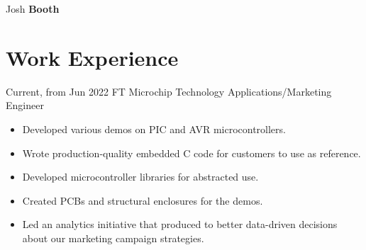 \documentclass[
	10pt, %
]{FreemanCV}
\begin{document}
\begin{paracol}{2} %


\parbox[][0.05\textheight][c]{\linewidth}{ %
	\centering %
	
	{\sffamily\Huge Josh \textbf{Booth}} %
	
	\medskip %
	
	
	\vfill %
}

\vspace*{-4pt}
\section{Work Experience}





\jobentry
	{Current, from Jun 2022} %
	{FT} %
	{Microchip Technology} %
	{Applications/Marketing Engineer} %
	{ %
	\vspace{-15pt}
	\begin{itemize}[leftmargin=0pt]
		\item Developed various demos on PIC and AVR microcontrollers.
		\item Wrote production-quality embedded C code for customers to use as reference.
		\item Developed microcontroller libraries for abstracted use.
		\item Created PCBs and structural enclosures for the demos.
		\item Led an analytics initiative that produced to better data-driven decisions about our marketing campaign strategies.
	\end{itemize}
	} 


\end{paracol}
\end{document}
